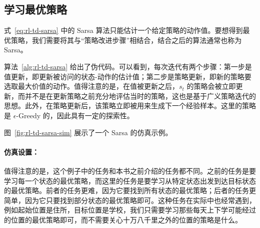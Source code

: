 \subsection{学习最优策略}
\label{sec:rl-td-sarsa-optimal}

式~\eqref{eq:rl-td-sarsa} 中的 Sarsa 算法只能估计一个给定策略的动作值。要想得到最优策略，我们需要将其与“策略改进步骤”相结合，结合之后的算法通常也称为 Sarsa。

算法~\ref{alg:rl-td-sarsa} 给出了伪代码。可以看到，每次迭代有两个步骤：第一步是值更新，即更新被访问的状态-动作的估计值；第二步是策略更新，即新的策略要选取最大价值的动作。值得注意的是，在值被更新之后，$s_t$ 的策略会被立即更新，而并不是在更新策略之前充分地评估当时的策略，这也是基于广义策略迭代的思想。此外，在策略更新后，该策略立即被用来生成下一个经验样本。这里的策略是 $\epsilon$-Greedy 的，因此具有一定的探索性。

图~\ref{fig:rl-td-sarsa-sim} 展示了一个 Sarsa 的仿真示例。

\paragraph{仿真设置：}
值得注意的是，这个例子中的任务和本书之前介绍的任务都不同。之前的任务是要学习每一个状态的最优策略，而这里的任务是要学习从特定状态出发到达目标状态的最优策略。前者的任务更难，因为它要找到所有状态的最优策略；后者的任务更简单，因为它只要找到部分状态的最优策略即可。这种任务在实际中也经常遇到，例如起始位置是住所，目标位置是学校，我们只需要学习那些每天上下学可能经过的位置的最优策略即可，而不需要关心十万八千里之外的位置的策略是什么。

